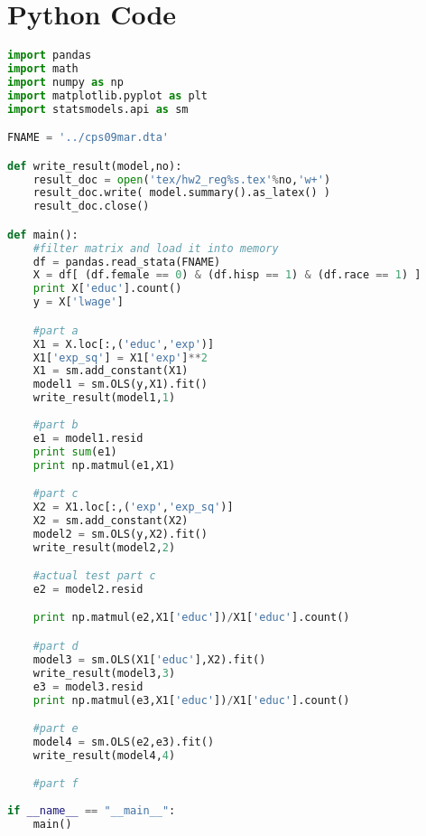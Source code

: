 \documentclass{article}
\begin{document}
\section{Python Code}
\begin{lstlisting}[language=Python]
import pandas
import math
import numpy as np
import matplotlib.pyplot as plt
import statsmodels.api as sm

FNAME = '../cps09mar.dta'

def write_result(model,no):
	result_doc = open('tex/hw2_reg%s.tex'%no,'w+')
	result_doc.write( model.summary().as_latex() )
	result_doc.close()

def main():
	#filter matrix and load it into memory
	df = pandas.read_stata(FNAME)
	X = df[ (df.female == 0) & (df.hisp == 1) & (df.race == 1) ]
	print X['educ'].count()
	y = X['lwage']

	#part a
	X1 = X.loc[:,('educ','exp')]
	X1['exp_sq'] = X1['exp']**2
	X1 = sm.add_constant(X1)
	model1 = sm.OLS(y,X1).fit()
	write_result(model1,1)
	
	#part b
	e1 = model1.resid
	print sum(e1)
	print np.matmul(e1,X1)

	#part c
	X2 = X1.loc[:,('exp','exp_sq')]
	X2 = sm.add_constant(X2)
	model2 = sm.OLS(y,X2).fit()
	write_result(model2,2)

	#actual test part c
	e2 = model2.resid

	print np.matmul(e2,X1['educ'])/X1['educ'].count()

	#part d
	model3 = sm.OLS(X1['educ'],X2).fit()
	write_result(model3,3)
	e3 = model3.resid
	print np.matmul(e3,X1['educ'])/X1['educ'].count()

	#part e
	model4 = sm.OLS(e2,e3).fit()
	write_result(model4,4)

	#part f
	
if __name__ == "__main__":
	main()

\end{lstlisting}
\end{document}

